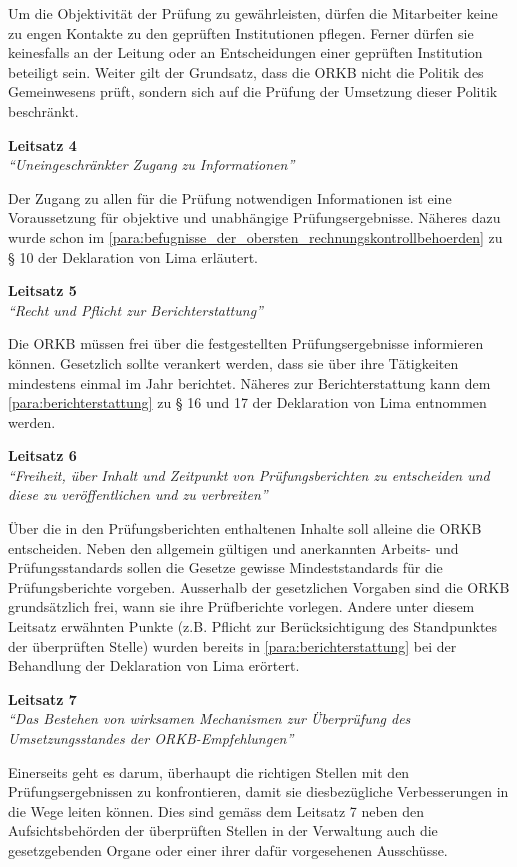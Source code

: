 \documentclass[10pt]{article}
\begin{document}
Um die Objektivität der Prüfung zu gewährleisten, dürfen die Mitarbeiter keine zu engen Kontakte zu den geprüften Institutionen pflegen. Ferner dürfen sie keinesfalls an der Leitung oder an Entscheidungen einer geprüften Institution beteiligt sein. Weiter gilt der Grundsatz, dass die ORKB nicht die Politik des Gemeinwesens prüft, sondern sich auf die Prüfung der Umsetzung dieser Politik beschränkt.

\textbf{Leitsatz 4}\\
\textit{“{}Uneingeschränkter Zugang zu Informationen”{}}

Der Zugang zu allen für die Prüfung notwendigen Informationen ist eine Voraussetzung für objektive und unabhängige Prüfungsergebnisse. Näheres dazu wurde schon im \vref{para:befugnisse_der_obersten_rechnungskontrollbehoerden} zu § 10 der Deklaration von Lima erläutert.

\textbf{Leitsatz 5}\\
\textit{“{}Recht und Pflicht zur Berichterstattung”{}}

Die ORKB müssen frei über die festgestellten Prüfungsergebnisse informieren können. Gesetzlich sollte verankert werden, dass sie über ihre Tätigkeiten mindestens einmal im Jahr berichtet. Näheres zur Berichterstattung kann dem \vref{para:berichterstattung} zu § 16 und 17 der Deklaration von Lima entnommen werden.

\textbf{Leitsatz 6}\\
\textit{“{}Freiheit, über Inhalt und Zeitpunkt von Prüfungsberichten zu entscheiden und diese zu veröffentlichen und zu verbreiten”{}}

Über die in den Prüfungsberichten enthaltenen Inhalte soll alleine die ORKB entscheiden. Neben den allgemein gültigen und anerkannten Arbeits- und Prüfungsstandards sollen die Gesetze gewisse Mindeststandards für die Prüfungsberichte vorgeben. Ausserhalb der gesetzlichen Vorgaben sind die ORKB grundsätzlich frei, wann sie ihre Prüfberichte vorlegen. Andere unter diesem Leitsatz erwähnten Punkte (z.B. Pflicht zur Berücksichtigung des Standpunktes der überprüften Stelle) wurden bereits in \vref{para:berichterstattung} bei der Behandlung der Deklaration von Lima erörtert.

\textbf{Leitsatz 7}\\
\textit{“{}Das Bestehen von wirksamen Mechanismen zur Überprüfung des Umsetzungsstandes der ORKB-Empfehlungen”{}}

Einerseits geht es darum, überhaupt die richtigen Stellen mit den Prüfungsergebnissen zu konfrontieren, damit sie diesbezügliche Verbesserungen in die Wege leiten können. Dies sind gemäss dem Leitsatz 7 neben den Aufsichtsbehörden der überprüften Stellen in der Ver­waltung auch die gesetzgebenden Organe oder einer ihrer dafür vorgesehenen Aus­schüsse. 
\end{document}
